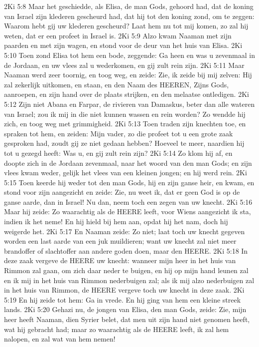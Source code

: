 2Ki 5:8  Maar het geschiedde, als Elisa, de man Gods, gehoord had, dat de koning van Israel zijn klederen gescheurd had, dat hij tot den koning zond, om te zeggen: Waarom hebt gij uw klederen gescheurd? Laat hem nu tot mij komen, zo zal hij weten, dat er een profeet in Israel is.
2Ki 5:9  Alzo kwam Naaman met zijn paarden en met zijn wagen, en stond voor de deur van het huis van Elisa.
2Ki 5:10  Toen zond Elisa tot hem een bode, zeggende: Ga heen en was u zevenmaal in de Jordaan, en uw vlees zal u wederkomen, en gij zult rein zijn.
2Ki 5:11  Maar Naaman werd zeer toornig, en toog weg, en zeide: Zie, ik zeide bij mij zelven: Hij zal zekerlijk uitkomen, en staan, en den Naam des HEEREN, Zijns Gods, aanroepen, en zijn hand over de plaats strijken, en den melaatse ontledigen.
2Ki 5:12  Zijn niet Abana en Farpar, de rivieren van Damaskus, beter dan alle wateren van Israel; zou ik mij in die niet kunnen wassen en rein worden? Zo wendde hij zich, en toog weg met grimmigheid.
2Ki 5:13  Toen traden zijn knechten toe, en spraken tot hem, en zeiden: Mijn vader, zo die profeet tot u een grote zaak gesproken had, zoudt gij ze niet gedaan hebben? Hoeveel te meer, naardien hij tot u gezegd heeft: Was u, en gij zult rein zijn?
2Ki 5:14  Zo klom hij af, en doopte zich in de Jordaan zevenmaal, naar het woord van den man Gods; en zijn vlees kwam weder, gelijk het vlees van een kleinen jongen; en hij werd rein.
2Ki 5:15  Toen keerde hij weder tot den man Gods, hij en zijn ganse heir, en kwam, en stond voor zijn aangezicht en zeide: Zie, nu weet ik, dat er geen God is op de ganse aarde, dan in Israel! Nu dan, neem toch een zegen van uw knecht.
2Ki 5:16  Maar hij zeide: Zo waarachtig als de HEERE leeft, voor Wiens aangezicht ik sta, indien ik het neme! En hij hield bij hem aan, opdat hij het nam, doch hij weigerde het.
2Ki 5:17  En Naaman zeide: Zo niet; laat toch uw knecht gegeven worden een last aarde van een juk muildieren; want uw knecht zal niet meer brandoffer of slachtoffer aan andere goden doen, maar den HEERE.
2Ki 5:18  In deze zaak vergeve de HEERE uw knecht: wanneer mijn heer in het huis van Rimmon zal gaan, om zich daar neder te buigen, en hij op mijn hand leunen zal en ik mij in het huis van Rimmon nederbuigen zal; als ik mij alzo nederbuigen zal in het huis van Rimmon, de HEERE vergeve toch uw knecht in deze zaak.
2Ki 5:19  En hij zeide tot hem: Ga in vrede. En hij ging van hem een kleine streek lands.
2Ki 5:20  Gehazi nu, de jongen van Elisa, den man Gods, zeide: Zie, mijn heer heeft Naaman, dien Syrier belet, dat men uit zijn hand niet genomen heeft, wat hij gebracht had; maar zo waarachtig als de HEERE leeft, ik zal hem nalopen, en zal wat van hem nemen!
